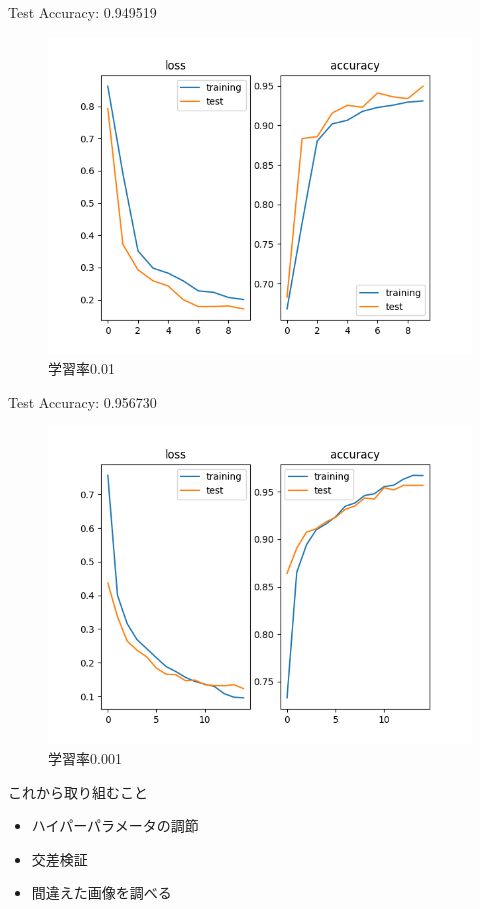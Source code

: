 \documentclass[dvipdfmx]{beamer}
\begin{document}
  \begin{frame}
    Test Accuracy: 0.949519
    \begin{figure}[H]
      \centering  
      \includegraphics[keepaspectratio, scale=.55]{images/train_deep_conv_lr0.01.png}
      \caption{学習率0.01}
      \label{deep_conv_lr=0.01}
    \end{figure}
  \end{frame}

  \begin{frame}
    Test Accuracy: 0.956730
    \begin{figure}[H]
      \centering  
      \includegraphics[keepaspectratio, scale=.55]{images/train_deep_conv_lr0.001.png}
      \caption{学習率0.001}
      \label{deep_conv_lr=0.001}
    \end{figure}
  \end{frame}

  \begin{frame}{これから取り組むこと}
    \begin{itemize}
      \item ハイパーパラメータの調節
      \item 交差検証
      \item 間違えた画像を調べる
    \end{itemize}
  \end{frame}
\end{document}
